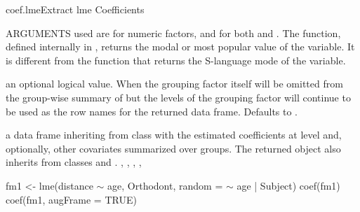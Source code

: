 \documentclass[pdftex]{article} \usepackage{url,graphicx}
\renewcommand{\Twiddle}{\mbox{\(\sim\)}}
\begin{document}
\begin{Helpfile}{coef.lme}{Extract lme Coefficients}
\begin{Argument}{ARGUMENTS}
used are  for numeric factors, and  for both
 and .  The  function, defined
internally in , returns the modal or most popular
value of the variable.  It is different from the  function
that returns the S-language mode of the variable.
\item[\Co{omitGroupingFactor:}]
an optional logical value.  When 
the grouping factor itself will be omitted from the group-wise
summary of  but the levels of the grouping factor will
continue to be used as the row names for the returned data frame.
Defaults to .
\end{Argument}
a data frame inheriting from class  with the estimated
coefficients at level  and, optionally, other covariates
summarized over groups. The returned object also inherits from classes
 and .
, ,
,
, 
\need 15pt
\vspace{-16pt}
\begin{Example}
fm1 <- lme(distance {\Twiddle} age, Orthodont, random = {\Twiddle} age | Subject)
coef(fm1)
coef(fm1, augFrame = TRUE)
\end{Example}
\end{Helpfile}
\end{document}
